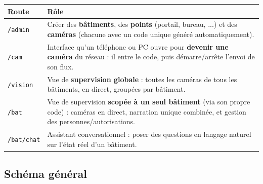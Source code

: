 \documentclass[11pt,a4paper]{article}
\begin{document}
\begin{center}
\renewcommand{\arraystretch}{1.4}
\begin{tabularx}{\linewidth}{@{}lX@{}}
\hline
\textbf{Route} & \textbf{R\^ole} \\
\hline
\texttt{/admin} & Cr\'eer des \textbf{b\^atiments}, des \textbf{points} (portail, bureau, ...) et des
\textbf{cam\'eras} (chacune avec un code unique g\'en\'er\'e automatiquement). \\
\texttt{/cam} & Interface qu'un t\'el\'ephone ou PC ouvre pour \textbf{devenir une cam\'era} du r\'eseau :
il entre le code, puis d\'emarre/arr\^ete l'envoi de son flux. \\
\texttt{/vision} & Vue de \textbf{supervision globale} : toutes les cam\'eras de tous les b\^atiments,
en direct, group\'ees par b\^atiment. \\
\texttt{/bat} & Vue de supervision \textbf{scop\'ee \`a un seul b\^atiment} (via son propre code) : cam\'eras
en direct, narration unique combin\'ee, et gestion des personnes/autorisations. \\
\texttt{/bat/chat} & Assistant conversationnel : poser des questions en langage naturel sur l'\'etat
r\'eel d'un b\^atiment. \\
\hline
\end{tabularx}
\end{center}

\subsection*{Sch\'ema g\'en\'eral}
\end{document}
